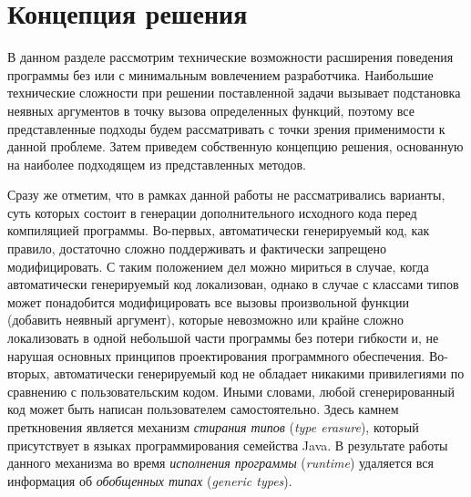 \chapter{Концепция решения}

В данном разделе рассмотрим технические возможности расширения поведения программы без или с минимальным вовлечением разработчика. Наибольшие технические сложности при решении поставленной задачи вызывает подстановка неявных аргументов в точку вызова определенных функций, поэтому все представленные подходы будем рассматривать с точки зрения применимости к данной проблеме. Затем приведем собственную концепцию решения, основанную на наиболее подходящем из представленных методов.

Сразу же отметим, что в рамках данной работы не рассматривались варианты, суть которых состоит в генерации дополнительного исходного кода перед компиляцией программы. Во-первых, автоматически генерируемый код, как правило, достаточно сложно поддерживать и фактически запрещено модифицировать. С таким положением дел можно мириться в случае, когда автоматически генерируемый код локализован, однако в случае с классами типов может понадобится модифицировать все вызовы произвольной функции (добавить неявный аргумент), которые невозможно или крайне сложно локализовать в одной небольшой части программы без потери гибкости и, не нарушая основных принципов проектирования программного обеспечения. Во-вторых, автоматически генерируемый код не обладает никакими привилегиями по сравнению с пользовательским кодом. Иными словами, любой сгенерированный код может быть написан пользователем самостоятельно. Здесь камнем преткновения является механизм \emph{стирания типов} (\emph{type erasure}), который присутствует в языках программирования семейства Java. В результате работы данного механизма во время \emph{исполнения программы} (\emph{runtime}) удаляется вся информация об \emph{обобщенных типах} (\emph{generic types}). 

